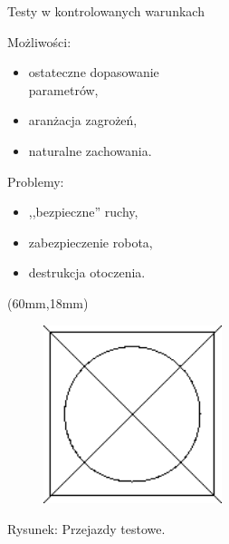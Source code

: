 \documentclass[xcolor=x11names,compress]{beamer}
\renewcommand{\(}{\begin{columns}}
\renewcommand{\)}{\end{columns}}
\newcommand{\<}[1]{\begin{column}{#1}}
\renewcommand{\>}{\end{column}}
\begin{document}
\begin{frame}{Testy w kontrolowanych warunkach}

\alert{Możliwości:}
\begin{itemize}
\item ostateczne dopasowanie \\parametrów,
\item aranżacja zagrożeń,
\item naturalne zachowania.
\end{itemize}

\vspace{.7cm}

\alert{Problemy:}
\begin{itemize}
\item ,,bezpieczne'' ruchy,
\item zabezpieczenie robota,
\item destrukcja otoczenia.
\end{itemize}

\begin{textblock*}{70mm}(60mm,18mm)%
    \begin{minipage}[c]{70mm}%
	\begin{figure}[h!]
	\includegraphics[width=5.2cm]{../Common/img/placeholder}
	\end{figure}
	\hspace{1cm}\scriptsize \alert{Rysunek:} Przejazdy testowe.
    \end{minipage}
\end{textblock*}

\end{frame}
\end{document}
